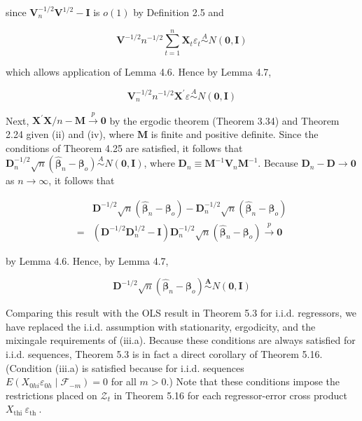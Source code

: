 \documentclass[10pt]{article}
\begin{document}
since $\mathbf{V}_{n}^{-1 / 2} \mathbf{V}^{1 / 2}-\mathbf{I}$ is $o(1)$ by Definition 2.5 and

$$
\mathbf{V}^{-1 / 2} n^{-1 / 2} \sum_{t=1}^{n} \mathbf{X}_{t} \varepsilon_{t} \stackrel{A}{\sim} N(\mathbf{0}, \mathbf{I})
$$

which allows application of Lemma 4.6. Hence by Lemma 4.7,

$$
\mathbf{V}_{n}^{-1 / 2} n^{-1 / 2} \mathbf{X}^{\prime} \varepsilon \stackrel{A}{\sim} N(\mathbf{0}, \mathbf{I})
$$

Next, $\mathbf{X}^{\prime} \mathbf{X} / n-\mathbf{M} \xrightarrow{p} \mathbf{0}$ by the ergodic theorem (Theorem 3.34) and Theorem 2.24 given (ii) and (iv), where $\mathbf{M}$ is finite and positive definite. Since the conditions of Theorem 4.25 are satisfied, it follows that $\mathbf{D}_{n}^{-1 / 2} \sqrt{n}\left(\hat{\boldsymbol{\beta}}_{n}-\right. \left.\boldsymbol{\beta}_{o}\right) \stackrel{A}{\sim} N(\mathbf{0}, \mathbf{I})$, where $\mathbf{D}_{n} \equiv \mathbf{M}^{-1} \mathbf{V}_{n} \mathbf{M}^{-1}$. Because $\mathbf{D}_{n}-\mathbf{D} \rightarrow \mathbf{0}$ as $n \rightarrow \infty$, it follows that

$$
\begin{aligned}
& \mathbf{D}^{-1 / 2} \sqrt{n}\left(\hat{\boldsymbol{\beta}}_{n}-\boldsymbol{\beta}_{o}\right)-\mathbf{D}_{n}^{-1 / 2} \sqrt{n}\left(\hat{\boldsymbol{\beta}}_{n}-\boldsymbol{\beta}_{o}\right) \\
= & \left(\mathbf{D}^{-1 / 2} \mathbf{D}_{n}^{1 / 2}-\mathbf{I}\right) \mathbf{D}_{n}^{-1 / 2} \sqrt{n}\left(\hat{\boldsymbol{\beta}}_{n}-\boldsymbol{\beta}_{o}\right) \xrightarrow{p} \mathbf{0}
\end{aligned}
$$

by Lemma 4.6. Hence, by Lemma 4.7,

$$
\mathbf{D}^{-1 / 2} \sqrt{n}\left(\hat{\boldsymbol{\beta}}_{n}-\boldsymbol{\beta}_{o}\right) \stackrel{\boldsymbol{A}}{\sim} N(\mathbf{0}, \mathbf{I})
$$

Comparing this result with the OLS result in Theorem 5.3 for i.i.d. regressors, we have replaced the i.i.d. assumption with stationarity, ergodicity, and the mixingale requirements of (iii.a). Because these conditions are always satisfied for i.i.d. sequences, Theorem 5.3 is in fact a direct corollary of Theorem 5.16. (Condition (iii.a) is satisfied because for i.i.d. sequences\\
$E\left(X_{0 h i} \varepsilon_{0 h} \mid \mathcal{F}_{-m}\right)=0$ for all $m>0$.) Note that these conditions impose the restrictions placed on $\mathcal{Z}_{t}$ in Theorem 5.16 for each regressor-error cross product $X_{\text {thi }} \varepsilon_{\text {th }}$.
\end{document}
